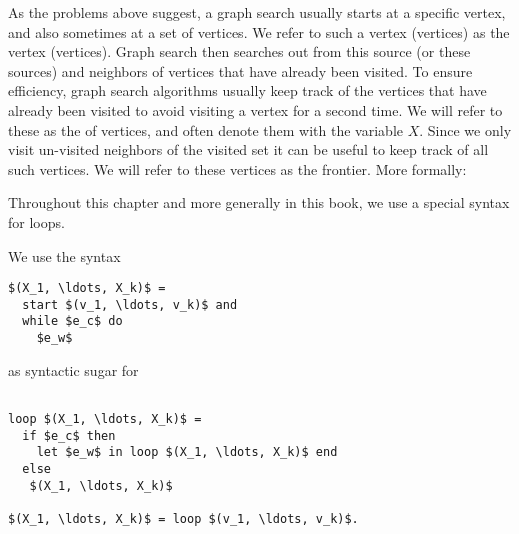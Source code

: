 As the problems above suggest, a graph search usually starts at a
specific vertex, and also sometimes at a set of vertices.  We refer to
such a vertex (vertices) as the  vertex (vertices). 
Graph search then searches out from this source (or these sources) and
 neighbors of vertices that have already been visited.
%
To ensure efficiency, graph search algorithms usually keep track of
the vertices that have already been visited to avoid visiting a
vertex for a second time.    We will refer to these as the
 of vertices, and often denote them with the
variable $X$.
Since we only visit un-visited neighbors of the visited set it can be useful to keep track of all such vertices.
We will refer to these vertices as the frontier.   More formally:

\begin{notesonly}
Throughout this chapter and more generally in this book, we use a
special syntax for loops.

\begin{syntax}
We use the syntax
~\\
\begin{lstlisting}
$(X_1, \ldots, X_k)$ = 
  start $(v_1, \ldots, v_k)$ and
  while $e_c$ do
    $e_w$
\end{lstlisting}
as syntactic sugar for 
\begin{lstlisting}

loop $(X_1, \ldots, X_k)$ = 
  if $e_c$ then
    let $e_w$ in loop $(X_1, \ldots, X_k)$ end
  else
   $(X_1, \ldots, X_k)$ 

$(X_1, \ldots, X_k)$ = loop $(v_1, \ldots, v_k)$. 
\end{lstlisting}

\end{syntax}
\end{notesonly}

